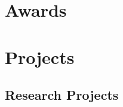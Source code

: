 \documentclass[12pt,letterpaper,sans]{moderncv} %
\newif\ifcameraready%
\begin{document}

\section{Awards}



\setlength{\bibsep}{8pt plus 0.3ex}


\nocite{*}


\section{Projects}

\subsection{Research Projects}

\ifcameraready%
\cventry{2017--2018}{Peloton: A Self-Driving In-Memory Database}{Open Source Project}{}{}{
Led a team of three graduate students to design and develop the database catalog for Peloton to support non-blocking schema change and to implement a concurrent lock-free skiplist index. This project is advised by Prof.\ \textbf{\href{http://www.cs.cmu.edu/~pavlo/}{Andy Pavlo}}.
}
\fi%
\end{document}
